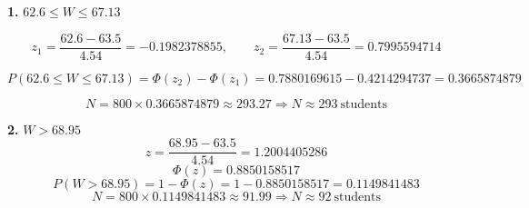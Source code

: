 \documentclass[12pt, a4paper]{article}
\begin{document}
\textbf{1. } $62.6 \le W \le 67.13$

\[
z_1=\frac{62.6-63.5}{4.54}=-0.1982378855,\qquad
z_2=\frac{67.13-63.5}{4.54}=0.7995594714
\]

\[
P(62.6\le W\le 67.13)=\Phi(z_2)-\Phi(z_1)
=0.7880169615-0.4214294737
=0.3665874879
\]

\[
N = 800\times 0.3665874879 \approx 293.27 \Rightarrow
\boxed{N\approx 293\ \text{students}}
\]


\textbf{2. } $W > 68.95$
\[
z=\frac{68.95-63.5}{4.54}=1.2004405286
\]
\[
\Phi(z)=0.8850158517
\]
\[
P(W>68.95)=1-\Phi(z)=1-0.8850158517=0.1149841483
\]
\[
N = 800\times 0.1149841483 \approx 91.99 \Rightarrow
\boxed{N\approx 92\ \text{students}}
\]
\end{document}
